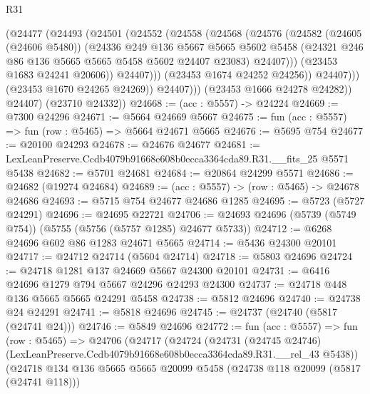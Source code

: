 \begin{lexlean}{R31}
\begin{coremodule}
                      (@24477
                        (@24493
                          (@24501
                            (@24552
                              (@24558
                                (@24568
                                  (@24576
                                    (@24582
                                      (@24605 (@24606 @5480))
                                      (@24336
                                        @249
                                        @136
                                        @5667
                                        @5665
                                        @5602
                                        @5458
                                        (@24321 @246 @86 @136 @5665 @5665 @5458 @5602 @24407 @23083)
                                        @24407)))
                                  (@23453 @1683 @24241 @20606))
                                @24407)))
                          (@23453 @1674 @24252 @24256))
                        @24407)))
                  (@23453 @1670 @24265 @24269))
                @24407)))
          (@23453 @1666 @24278 @24282))
        @24407)
      (@23710 @24332))
@24668 := (acc : @5557) -> @24224
@24669 := @7300 @24296
@24671 := @5664 @24669 @5667
@24675 := fun (acc : @5557) => fun (row : @5465) => @5664 @24671 @5665
@24676 := @5695 @754
@24677 := @20100 @24293
@24678 := @24676 @24677
@24681 := LexLeanPreserve.Ccdb4079b91668e608b0ecca3364cda89.R31.__fits_25 @5571 @5438
@24682 := @5701 @24681
@24684 := @20864 @24299 @5571
@24686 := @24682 (@19274 @24684)
@24689 := (acc : @5557) -> (row : @5465) -> @24678 @24686
@24693 := @5715 @754 @24677 @24686 @1285
@24695 := @5723 (@5727 @24291)
@24696 := @24695 @22721
@24706 := @24693 @24696 (@5739 (@5749 @754)) (@5755 (@5756 (@5757 @1285) @24677 @5733))
@24712 := @6268 @24696 @602 @86 @1283 @24671 @5665
@24714 := @5436 @24300 @20101
@24717 := @24712 @24714 (@5604 @24714)
@24718 := @5803 @24696
@24724 := @24718 @1281 @137 @24669 @5667 @24300 @20101
@24731 := @6416 @24696 @1279 @794 @5667 @24296 @24293 @24300
@24737 := @24718 @448 @136 @5665 @5665 @24291 @5458
@24738 := @5812 @24696
@24740 := @24738 @24 @24291
@24741 := @5818 @24696
@24745 := @24737 (@24740 (@5817 (@24741 @24)))
@24746 := @5849 @24696
@24772 := fun (acc : @5557) =>
  fun (row : @5465) =>
  @24706
    (@24717
      (@24724
        (@24731
          (@24745 @24746)
          (LexLeanPreserve.Ccdb4079b91668e608b0ecca3364cda89.R31.__rel_43 @5438))
        (@24718
          @134
          @136
          @5665
          @5665
          @20099
          @5458
          (@24738 @118 @20099 (@5817 (@24741 @118)))

\end{coremodule}
\end{lexlean}
